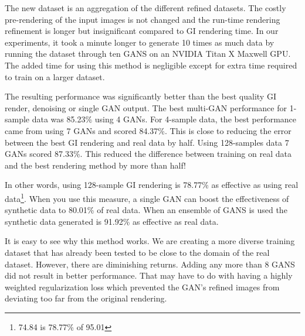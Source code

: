 \documentclass[10pt,twocolumn,letterpaper]{article}
\begin{document}
The new dataset is an aggregation of the different refined datasets.  The costly pre-rendering of the input images is not changed and the run-time rendering refinement is longer but insignificant compared to GI rendering time.  In our experiments, it took a minute longer to generate 10 times as much data by running the dataset through ten GANS on an NVIDIA Titan X Maxwell GPU. %
The added time for using this method is negligible except for extra time required to train on a larger dataset.

The resulting performance was significantly better than the best quality GI render, denoising or single GAN output.  The best multi-GAN performance for 1-sample data was 85.23\% using 4 GANs.  For 4-sample data, the best performance came from using 7 GANs and scored 84.37\%. This is close to reducing the error between the best GI rendering and real data by half. Using 128-samples data 7 GANs scored 87.33\%. This reduced the difference between training on real data and the best rendering method by more than half!

In other words, using 128-sample GI rendering is 78.77\% as effective as using real data\footnote{74.84 is 78.77\% of 95.01}.  When you use this measure, a single GAN can boost the effectiveness of synthetic data to 80.01\% of real data.  When an ensemble of GANS is used the synthetic data generated is 91.92\% as effective as real data. 


It is easy to see why this method works. We are creating a more diverse training dataset that has already been tested to be close to the domain of the real dataset.  However, there are diminishing returns.  Adding any more than 8 GANS did not result in better performance.  That may have to do with having a highly weighted regularization loss which prevented the GAN's refined images from deviating too far from the original rendering.  
\end{document}
